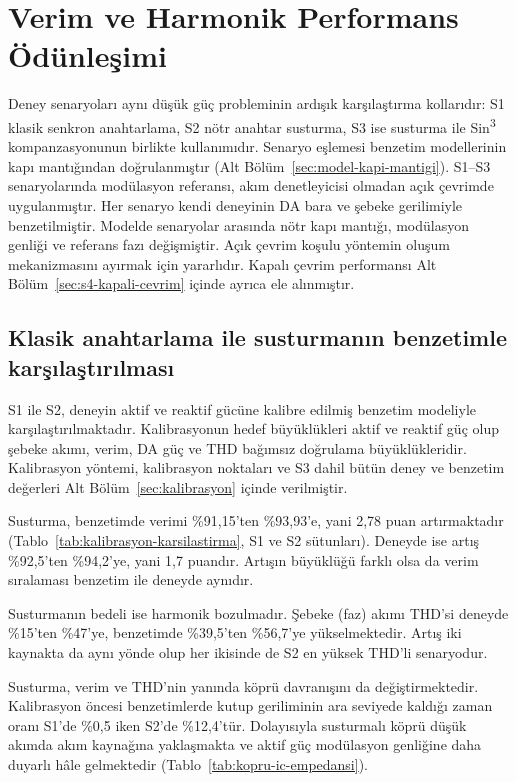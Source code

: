 \sekilsonrabaslik
\section{Verim ve Harmonik Performans Ödünleşimi}

Deney senaryoları aynı düşük güç probleminin ardışık karşılaştırma kollarıdır: S1 klasik senkron anahtarlama, S2 nötr anahtar susturma, S3 ise susturma ile Sin\textsuperscript{3} kompanzasyonunun birlikte kullanımıdır. Senaryo eşlemesi benzetim modellerinin kapı mantığından doğrulanmıştır (Alt Bölüm~\ref{sec:model-kapi-mantigi}). S1--S3 senaryolarında modülasyon referansı, akım denetleyicisi olmadan açık çevrimde uygulanmıştır. Her senaryo kendi deneyinin DA bara ve şebeke gerilimiyle benzetilmiştir. Modelde senaryolar arasında nötr kapı mantığı, modülasyon genliği ve referans fazı değişmiştir. Açık çevrim koşulu yöntemin oluşum mekanizmasını ayırmak için yararlıdır. Kapalı çevrim performansı Alt Bölüm~\ref{sec:s4-kapali-cevrim} içinde ayrıca ele alınmıştır.

\subsection{Klasik anahtarlama ile susturmanın benzetimle karşılaştırılması}
\label{sec:s1-s2-kalibre}

S1 ile S2, deneyin aktif ve reaktif gücüne kalibre edilmiş benzetim modeliyle karşılaştırılmaktadır. Kalibrasyonun hedef büyüklükleri aktif ve reaktif güç olup şebeke akımı, verim, DA güç ve THD bağımsız doğrulama büyüklükleridir. Kalibrasyon yöntemi, kalibrasyon noktaları ve S3 dahil bütün deney ve benzetim değerleri Alt Bölüm~\ref{sec:kalibrasyon} içinde verilmiştir.

Susturma, benzetimde verimi \%91,15'ten \%93,93'e, yani 2,78 puan artırmaktadır (Tablo~\ref{tab:kalibrasyon-karsilastirma}, S1 ve S2 sütunları). Deneyde ise artış \%92,5'ten \%94,2'ye, yani 1,7 puandır. Artışın büyüklüğü farklı olsa da verim sıralaması benzetim ile deneyde aynıdır.

Susturmanın bedeli ise harmonik bozulmadır. Şebeke (faz) akımı THD'si deneyde \%15'ten \%47'ye, benzetimde \%39,5'ten \%56,7'ye yükselmektedir. Artış iki kaynakta da aynı yönde olup her ikisinde de S2 en yüksek THD'li senaryodur.

Susturma, verim ve THD'nin yanında köprü davranışını da değiştirmektedir. Kalibrasyon öncesi benzetimlerde kutup geriliminin ara seviyede kaldığı zaman oranı S1'de \%0,5 iken S2'de \%12,4'tür. Dolayısıyla susturmalı köprü düşük akımda akım kaynağına yaklaşmakta ve aktif güç modülasyon genliğine daha duyarlı hâle gelmektedir (Tablo~\ref{tab:kopru-ic-empedansi}).

